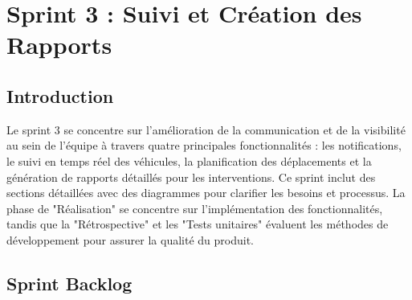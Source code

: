 
\chapter{Sprint 3 : Suivi et Création des Rapports}

\section*{Introduction}

Le sprint 3 se concentre sur l'amélioration de la communication et de la visibilité au sein de l'équipe à travers quatre principales fonctionnalités : les notifications, le suivi en temps réel des véhicules, la planification des déplacements et la génération de rapports détaillés pour les interventions. Ce sprint inclut des sections détaillées avec des diagrammes pour clarifier les besoins et processus. La phase de "Réalisation" se concentre sur l'implémentation des fonctionnalités, tandis que la "Rétrospective" et les "Tests unitaires" évaluent les méthodes de développement pour assurer la qualité du produit.


\section{Sprint Backlog}

